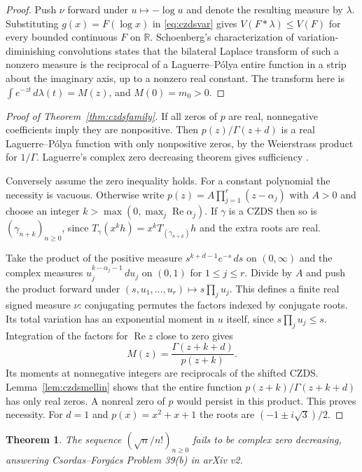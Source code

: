 \documentclass[11pt,a4paper]{article}
\newtheorem{theorem}{Theorem}[section]
\begin{document}
\begin{proof}
Push $\nu$ forward under $u\mapsto-\log u$ and denote the resulting
measure by $\lambda$. Substituting $g(x)=F(\log x)$ in
\eqref{eq:czdsvar} gives $V(F*\lambda)\le V(F)$ for every bounded
continuous $F$ on $\mathbb R$. Schoenberg's characterization of
variation-diminishing convolutions \cite[Theorem 2, p.~99]{ISczds}
states that the bilateral Laplace transform of such a nonzero measure
is the reciprocal of a Laguerre--P\'olya entire function in a strip
about the imaginary axis, up to a nonzero real constant. The transform
here is $\int e^{-zt}\,d\lambda(t)=M(z)$, and $M(0)=m_0>0$.
\end{proof}

\begin{proof}[Proof of Theorem~\ref{thm:czdsfamily}]
If all zeros of $p$ are real, nonnegative coefficients imply they are
nonpositive. Then $p(z)/\Gamma(z+d)$ is a real Laguerre--P\'olya
function with only nonpositive zeros, by the Weierstrass product for
$1/\Gamma$. Laguerre's complex zero decreasing theorem gives sufficiency
\cite[Theorem 4.1(3)]{CCsurveyZero}.

Conversely assume the zero inequality holds. For a constant polynomial
the necessity is vacuous. Otherwise write
$p(z)=A\prod_{j=1}^r(z-\alpha_j)$ with $A>0$ and choose an integer
$k>\max(0,\max_j\operatorname{Re}\alpha_j)$. If $\gamma$ is a CZDS
then so is $(\gamma_{n+k})_{n\ge0}$, since
$T_\gamma(x^kh)=x^kT_{(\gamma_{n+k})}h$ and the extra roots are real.

Take the product of the positive measure
$s^{k+d-1}e^{-s}\,ds$ on $(0,\infty)$ and the complex measures
$u_j^{k-\alpha_j-1}\,du_j$ on $(0,1)$ for $1\le j\le r$.
Divide by $A$ and push the product forward under
$(s,u_1,\ldots,u_r)\mapsto s\prod_j u_j$. This defines a finite
real signed measure $\nu$: conjugating permutes the factors indexed
by conjugate roots. Its total variation has an exponential moment
in $u$ itself, since $s\prod_j u_j\le s$. Integration of the factors
for $\operatorname{Re}z$ close to zero gives
\[
    M(z)=\frac{\Gamma(z+k+d)}{p(z+k)}.
\]
Its moments at nonnegative integers are reciprocals of the shifted CZDS.
Lemma~\ref{lem:czdsmellin} shows that the entire function
$p(z+k)/\Gamma(z+k+d)$ has only real zeros. A nonreal zero of $p$
would persist in this product. This proves necessity. For $d=1$ and
$p(x)=x^2+x+1$ the roots are $(-1\pm i\sqrt3)/2$.
\end{proof}

\begin{theorem}\label{thm:czdssqrt}
The sequence $(\sqrt{n}/n!)_{n\ge0}$ fails to be complex zero
decreasing, answering Csordas--Forg\'acs Problem 39(b) in arXiv v2.
\end{theorem}
\end{document}
